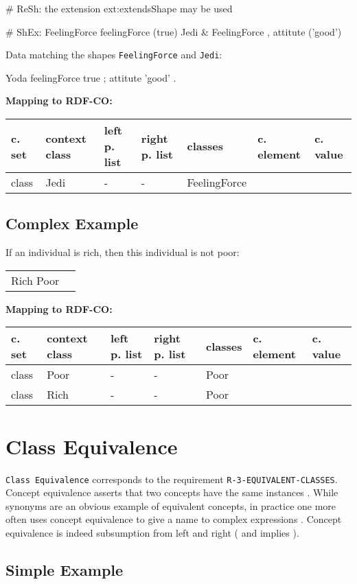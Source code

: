 \documentclass{llncs}
\newcommand{\ms}[1]{\texttt{#1}}
\newenvironment{gcotable}{
  \scriptsize
  \sffamily
  \vspace{0cm}
	\begin{center}
	\textbf{\vspace{0.4cm}Mapping to RDF-CO:} \\
  \begin{tabular}{l|l|l|l|l|l|l}
	\hline
  \textbf{c. set} & \textbf{context class} & \textbf{left p. list} & \textbf{right p. list} & \textbf{classes} & \textbf{c. element} & \textbf{c. value} \\
  \hline

}{
  \hline
  \end{tabular}
	\end{center}
}
\newenvironment{DL}{
\vspace{0cm}
	\begin{center}
  \begin{tabular}{r l}

}{
  \end{tabular}
	\end{center}
}
\begin{document}
\begin{ex}
# ReSh:
the extension ext:extendsShape may be used
\end{ex}

\begin{ex}
# ShEx:
FeelingForce {
    feelingForce (true) }
Jedi {
    & FeelingForce ,
    attitute ('good') }
\end{ex}

Data matching the shapes \ms{FeelingForce} and \ms{Jedi}:

\begin{ex}
Yoda 
    feelingForce true ;
    attitute 'good' .
\end{ex}

\begin{gcotable}
class & Jedi & - & - & FeelingForce &  \\
\end{gcotable}

\subsection{Complex Example}

If an individual is rich, then this individual is not poor:

\begin{DL}
Rich   Poor 
\end{DL}

\begin{gcotable}
class &  Poor & - & - & Poor &  \\
class & Rich & - & - &  Poor &  \\
\end{gcotable}

\section{Class Equivalence}

\ms{Class Equivalence} corresponds to the requirement \ms{R-3-EQUIVALENT-CLASSES}.
Concept equivalence asserts that two concepts have the same instances \cite{Kroetzsch2012}.
While synonyms are an obvious example of equivalent concepts, in practice one more
often uses concept equivalence to give a name to complex expressions \cite{Kroetzsch2012}.
Concept equivalence is indeed subsumption from left and right ( and  implies  ).

\subsection{Simple Example}
\end{document}
